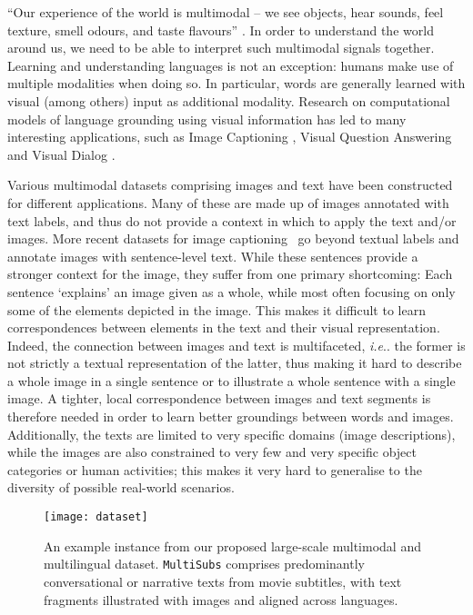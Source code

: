 \documentclass[twocolumn]{svjour3}          \smartqed  \usepackage{graphicx}
\makeatletter
\newcommand{\multisubs}{\texttt{MultiSubs}\xspace}
\DeclareRobustCommand\onedot{\futurelet\@let@token\@onedot}
\def\@onedot{\ifx\@let@token.\else.\null\fi\xspace}
\newcommand{\ie}{\emph{i.e}\onedot} \newcommand{\Ie}{\emph{I.e}\onedot}
\makeatother
\begin{document}
``Our experience of the world is multimodal -- we see objects, hear sounds, feel texture, smell odours, and taste flavours'' \cite{BaltrusaitisEtAl:2019}. In order to understand the world around us, we need to be able to interpret such multimodal signals together. Learning and understanding languages is not an exception: humans make use of multiple modalities when doing so. In particular, words are generally learned with visual (among others) input as additional modality. Research on computational models of language grounding using visual information has led to many interesting applications, such as Image Captioning \cite{VinyalsEtAl:2015}, Visual Question Answering \cite{AntolEtAl:2015} and Visual Dialog \cite{DasEtAl:2017}.

Various multimodal datasets comprising images and text have been constructed for different applications. Many of these are made up of images annotated with text labels, and thus do not provide a context in which to apply the text and/or images. More recent datasets for image captioning~\cite{ChenEtAl:2015,YoungEtAl:2014} go beyond textual labels and annotate images with sentence-level text. While these sentences provide a stronger context for the image, they suffer from one primary shortcoming: Each sentence `explains' an image given as a whole, while most often focusing on only some of the elements depicted in the image. This makes it difficult to learn correspondences between elements in the text and their visual representation. Indeed, the connection between images and text is multifaceted, \ie the former is not strictly a textual representation of the latter, thus making it hard to describe a whole image in a single sentence or to illustrate a whole sentence with a single image. A tighter, local correspondence between images and text segments is therefore needed in order to learn better groundings between words and images. Additionally, the texts are limited to very specific domains (image descriptions), while the images are also constrained to very few and very specific object categories or human activities; this makes it very hard to generalise to the diversity of possible real-world scenarios.

\begin{figure}[t]
    \centering
    \texttt{[image: dataset]}
    \caption{An example instance from our proposed large-scale multimodal and multilingual dataset. \multisubs comprises predominantly conversational or narrative texts from movie subtitles, with text fragments illustrated with images and aligned across languages. }
    \label{fig:overview}
\end{figure}
\end{document}
